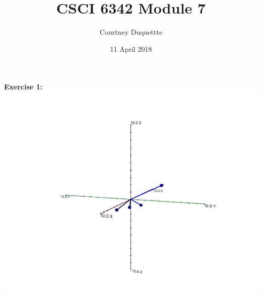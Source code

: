 \documentclass[10pt]{article}
\title{CSCI 6342 Module 7}
\author{Courtney Duquettte}
\date{11 April 2018}
\begin{document}
	\maketitle
	
	\textbf{\large Exercise 1:}\\
	\includegraphics[scale=0.2]{module7_exercise1}
	\\
	
\end{document}
